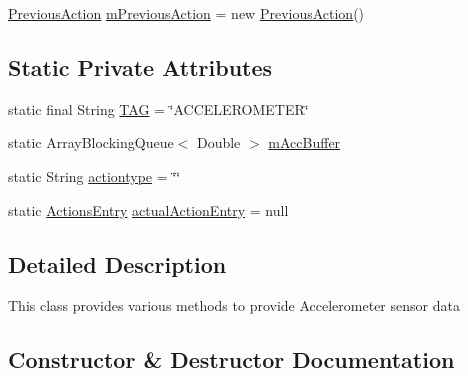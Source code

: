 \begin{DoxyCompactItemize}
\item 
\hyperlink{classcs_1_1usense_1_1accelerometer_1_1_accelerometer_pipeline_1_1_previous_action}{Previous\+Action} \hyperlink{classcs_1_1usense_1_1accelerometer_1_1_accelerometer_pipeline_a86d5697845c1a5e4469c78de919cb6fe}{m\+Previous\+Action} = new \hyperlink{classcs_1_1usense_1_1accelerometer_1_1_accelerometer_pipeline_1_1_previous_action}{Previous\+Action}()
\end{DoxyCompactItemize}
\subsection*{Static Private Attributes}
\begin{DoxyCompactItemize}
\item 
static final String \hyperlink{classcs_1_1usense_1_1accelerometer_1_1_accelerometer_pipeline_a9529f85cce0a73aef1acb8c643b470d7}{T\+A\+G} = \char`\"{}A\+C\+C\+E\+L\+E\+R\+O\+M\+E\+T\+E\+R\char`\"{}
\item 
static Array\+Blocking\+Queue$<$ Double $>$ \hyperlink{classcs_1_1usense_1_1accelerometer_1_1_accelerometer_pipeline_a2ca26caa30a7a702089708c1586147b1}{m\+Acc\+Buffer}
\item 
static String \hyperlink{classcs_1_1usense_1_1accelerometer_1_1_accelerometer_pipeline_a0e1f7822542dab0066358cb0b06906ba}{actiontype} = \char`\"{}\char`\"{}
\item 
static \hyperlink{classcs_1_1usense_1_1accelerometer_1_1_actions_entry}{Actions\+Entry} \hyperlink{classcs_1_1usense_1_1accelerometer_1_1_accelerometer_pipeline_a45bb974339a1e8c6f41a65cc4c1c29d3}{actual\+Action\+Entry} = null
\end{DoxyCompactItemize}


\subsection{Detailed Description}
This class provides various methods to provide Accelerometer sensor data 

\subsection{Constructor \& Destructor Documentation}
\hypertarget{classcs_1_1usense_1_1accelerometer_1_1_accelerometer_pipeline_a9bbc2abacfc59228d90ae9156acb905b}{}
